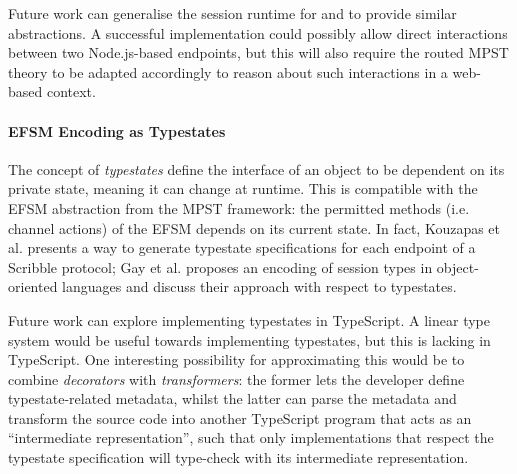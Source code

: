 Future work can generalise the session runtime for 
 and  to provide
similar abstractions. A successful implementation could
possibly allow direct interactions between two Node.js-based
endpoints, but this will also require the routed MPST
theory to be adapted accordingly to reason about
such interactions in a web-based context.

\paragraph{EFSM Encoding as Typestates}
The concept of \textit{typestates} define the interface of
an object to be dependent on its private state, meaning
it can change at runtime.
This is compatible with the EFSM abstraction from the
MPST framework: the permitted methods (i.e. channel actions)
of the EFSM depends on its current state.
In fact, Kouzapas et al. \cite{StMungo} presents a way to
generate typestate specifications for each endpoint of a
Scribble protocol; Gay et al. \cite{ModularST} proposes
an encoding of session types in object-oriented languages
and discuss their approach with respect to typestates.

Future work can explore implementing typestates
in TypeScript. A linear type system would be useful towards 
implementing typestates, but this is lacking in TypeScript.
One interesting possibility for approximating this would
be to combine \textit{decorators} with \textit{transformers}:
the former lets the developer define typestate-related metadata,
whilst the latter can parse the metadata and
transform the source code into another TypeScript program that acts
as an ``intermediate representation'',
such that only implementations that respect the typestate specification
will type-check with its intermediate representation.